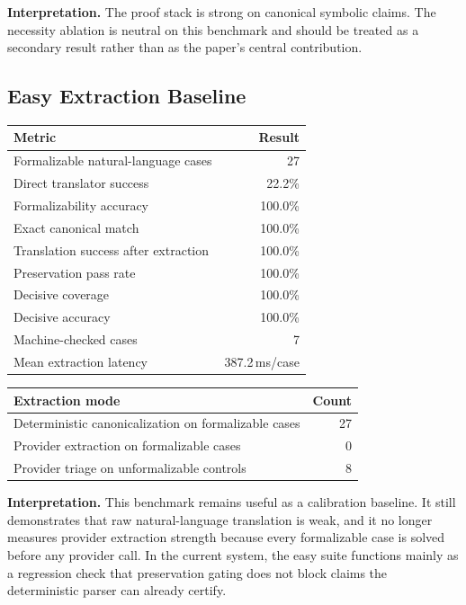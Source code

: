 \documentclass[11pt]{article}
\begin{document}
\textbf{Interpretation.} The proof stack is strong on canonical symbolic
claims. The necessity ablation is neutral on this benchmark and should be
treated as a secondary result rather than as the paper's central contribution.

\subsection{Easy Extraction Baseline}

\begin{center}
\footnotesize
\begin{tabular}{lr}
\toprule
\textbf{Metric} & \textbf{Result} \\
\midrule
Formalizable natural-language cases & 27 \\
Direct translator success & 22.2\% \\
Formalizability accuracy & 100.0\% \\
Exact canonical match & 100.0\% \\
Translation success after extraction & 100.0\% \\
Preservation pass rate & 100.0\% \\
Decisive coverage & 100.0\% \\
Decisive accuracy & 100.0\% \\
Machine-checked cases & 7 \\
Mean extraction latency & 387.2\,ms/case \\
\bottomrule
\end{tabular}
\normalsize
\end{center}

\begin{center}
\footnotesize
\begin{tabular}{lr}
\toprule
\textbf{Extraction mode} & \textbf{Count} \\
\midrule
Deterministic canonicalization on formalizable cases & 27 \\
Provider extraction on formalizable cases & 0 \\
Provider triage on unformalizable controls & 8 \\
\bottomrule
\end{tabular}
\normalsize
\end{center}

\textbf{Interpretation.} This benchmark remains useful as a calibration
baseline. It still demonstrates that raw natural-language translation is weak,
and it no longer measures provider extraction strength because every
formalizable case is solved before any provider call. In the current system,
the easy suite functions mainly as a regression check that preservation gating
does not block claims the deterministic parser can already certify.
\end{document}
